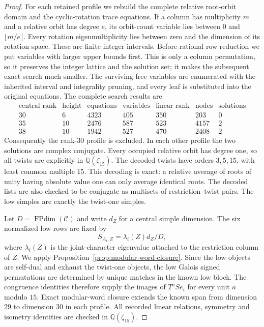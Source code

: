 \begin{proof}
For each retained profile we rebuild the complete relative root-orbit
domain and the cyclic-rotation trace equations. If a column has
multiplicity $m$ and a relative orbit has degree $e$, its orbit-count
variable lies between $0$ and $\lfloor m/e\rfloor$. Every rotation
eigenmultiplicity lies between zero and the dimension of its rotation
space. These are finite integer intervals. Before rational row reduction
we put variables with larger upper bounds first. This is only a column
permutation, so it preserves the integer lattice and the solution set;
it makes the subsequent exact search much smaller. The surviving free
variables are enumerated with the inherited interval and integrality
pruning, and every leaf is substituted into the original equations.
The complete search results are
\[
\begin{array}{c|rrrrrr}
\text{central rank}&\text{height}&\text{equations}&\text{variables}&
 \text{linear rank}&\text{nodes}&\text{solutions}\\ \hline
30&6&4323&405&350&203&0\\
35&10&2476&587&523&4157&2\\
38&10&1942&527&470&2408&2
\end{array}
\]
Consequently the rank-$30$ profile is excluded. In each other profile the
two solutions are complex conjugate. Every occupied relative orbit has
degree one, so all twists are explicitly in $\mathbb Q(\zeta_{15})$.
The decoded twists have orders $3,5,15$, with least common multiple $15$.
This decoding is exact: a relative average of roots of unity having
absolute value one can only average identical roots. The decoded lists
are also checked to be conjugate as multisets of restriction--twist
pairs. The low simples are exactly the twist-one simples.

Let $D=\operatorname{FPdim}(\mathcal C)$ and write $d_Z$ for a central
simple dimension. The six normalized low rows are fixed by
\[
 S_{A_i,Z}=\lambda_i(Z)d_Z/D,
\]
where $\lambda_i(Z)$ is the joint-character eigenvalue attached to the
restriction column of $Z$. We apply
Proposition~\ref{prop:modular-word-closure}. Since the low objects are
self-dual and exhaust the twist-one objects, the low Galois signed
permutations are determined by unique matches in the known low block.
The congruence identities therefore supply the images of
$T^aSe_i$ for every unit $a$ modulo $15$. Exact modular-word closure
extends the known span from dimension $29$ to dimension $30$ in each
profile. All recorded linear relations, symmetry and isometry identities
are checked in $\mathbb Q(\zeta_{15})$.


\end{proof}
